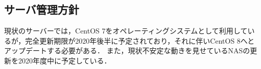 \subsection*{サーバ管理方針}

現状のサーバーでは，CentOS 7をオペレーティングシステムとして利用しているが，完全更新期限が2020年後半に予定されており，それに伴いCentOS 8へとアップデートする必要がある．
また，現状不安定な動きを見せているNASの更新を2020年度中に予定している．